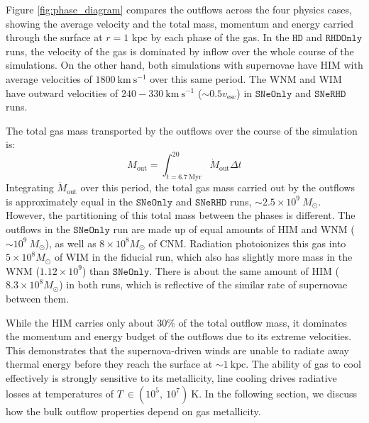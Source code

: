 \documentclass[twocolumn,linenumbers]{aastex631}
\begin{document}
Figure \ref{fig:phase_diagram} compares the outflows across the four physics cases, showing the average velocity and the total mass, momentum and energy carried through the surface at $r = 1$ kpc by each phase of the gas. In the $\mathtt{HD}$ and $\mathtt{RHDOnly}$ runs, the velocity of the gas is dominated by inflow over the whole course of the simulations. On the other hand, both simulations with supernovae have HIM with average velocities of $1800\ \mathrm{km\ s^{-1}}$ over this same period. The WNM and WIM have outward velocities of $240-330\ \mathrm{km\ s^{-1}}$ ($\sim 0.5 v_\mathrm{esc}$) in $\mathtt{SNeOnly}$ and $\mathtt{SNeRHD}$ runs.

The total gas mass transported by the outflows over the course of the simulation is: 
\begin{equation}
    M_\mathrm{out} = \int_{t=6.7\ \mathrm{Myr}}^{20} \dot{M}_\mathrm{out} \Delta t
\end{equation}
 Integrating $\dot{M}_\mathrm{out}$ over this period, the total gas mass carried out by the outflows is approximately equal in the $\mathtt{SNeOnly}$ and $\mathtt{SNeRHD}$ runs, $\sim 2.5\times 10^9\ M_\odot$. However, the partitioning of this total mass between the phases is different. The outflows in the $\mathtt{SNeOnly}$ run are made up of equal amounts of HIM and WNM ($\sim 10^9\ M_\odot$), as well as $8\times 10^8 M_\odot$ of CNM. Radiation photoionizes this gas into $5 \times 10^8 M_\odot$ of WIM in the fiducial run, which also has slightly more mass in the WNM ($1.12\times 10^9$) than  $\mathtt{SNeOnly}$. There is about the same amount of HIM ($8.3\times 10^8 M_\odot$) in both runs, which is reflective of the similar rate of supernovae between them.

While the HIM carries only about $30\%$ of the total outflow mass, it dominates the momentum and energy budget of the outflows due to its extreme velocities. 
This demonstrates that the supernova-driven winds are unable to radiate away thermal energy before they reach the surface at $\sim 1\ \mathrm{kpc}$.
The ability of gas to cool effectively is strongly sensitive to its metallicity, line cooling drives radiative losses at temperatures of $T\ \in (10^5,\ 10^7)\ \mathrm{K}$. In the following section, we discuss how the bulk outflow properties depend on gas metallicity.
\end{document}
